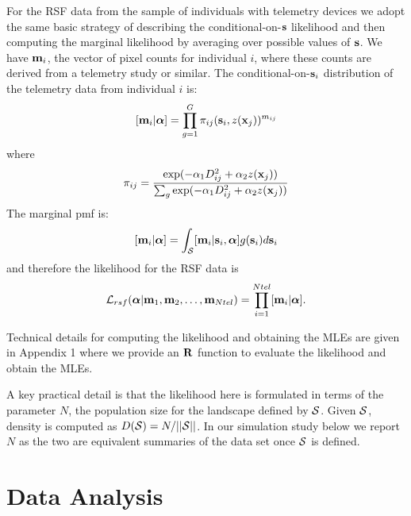For the RSF data from the sample of individuals with telemetry devices
we adopt the same basic strategy of describing the
conditional-on-${\bf s}$ likelihood and then computing the marginal
likelihood by averaging over possible values of ${\bf s}$.
We have ${\bf m}_{i}$, the vector of pixel counts for individual $i$,
where these counts are derived from a telemetry study or similar.
The conditional-on-${\bf s}_{i}$ distribution of the telemetry data
from individual $i$ is:
\[
 [{\bf m}_{i}  | {\bm \alpha} ]
 = \prod_{g=1}^{G}  \pi_{ij}({\bf s}_{i},z({\bf x}_{j})) ^{m_{ij}}
\]
where
\[
 \pi_{ij}  = \frac{ \exp( -\alpha_{1} D_{ij}^{2} +\alpha_{2} z({\bf x}_{j}) ) }
{ \sum_{g} \exp(-\alpha_{1} D_{ij}^{2} +\alpha_{2} z({\bf x}_{j}))}
\]
The marginal pmf is:
\[
     [{\bf m}_{i}|{\bm \alpha}] =    \int_{{\cal S}}  [ {\bf m}_{i} |{\bf s}_{i},{\bm \alpha}] g({\bf s}_{i}) d{\bf s}_{i}
\]
and therefore the likelihood for the RSF data is
\[
{\cal L}_{rsf}({\bm \alpha} | {\bf m}_{1},{\bf m}_{2},\ldots, {\bf m}_{Ntel}) = \prod_{i=1}^{Ntel}
[{\bf m}_{i}|{\bm \alpha}].
\]

Technical details for computing the likelihood and obtaining the MLEs
are given in Appendix 1 where we provide an ${\bf R}$ function to
evaluate the likelihood and obtain the MLEs.

A key practical detail
is that the likelihood here is formulated in terms of the parameter
$N$, the population size for the landscape defined by ${\cal
  S}$. Given ${\cal S}$, density is computed as $D({\cal S}) =
N/||{\cal S}||$. In our simulation study below we report $N$ as the
two are equivalent summaries of the data set once ${\cal S}$ is
defined.


\section{Data Analysis}


